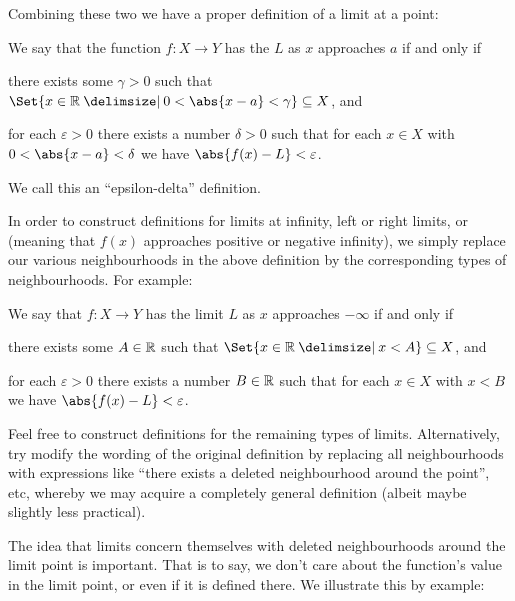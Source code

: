 Combining these two we have a proper definition of a limit at a point:

\begin{definition}
	We say that the function $f \colon X \to Y$ has the  $L$ as $x$ approaches $a$ if and only if
	\begin{romanlist}
		\item there exists some $\gamma > 0$ such that $\Set{x \in \R \given 0 < \abs{x - a} < \gamma} \subseteq X$, and
		\item for each $\varepsilon > 0$ there exists a number $\delta > 0$ such that for each $x \in X$ with $0 < \abs{x - a} < \delta$ we have $\abs{f(x) - L} < \varepsilon$.
	\end{romanlist}
\end{definition}

\noindent
We call this an ``epsilon-delta'' definition.

In order to construct definitions for limits at infinity, left or right limits, or  (meaning that $f(x)$ approaches positive or negative infinity), we simply replace our various neighbourhoods in the above definition by the corresponding types of neighbourhoods.
For example:

\begin{definition}
	We say that $f \colon X \to Y$ has the limit $L$ as $x$ approaches $-\infty$ if and only if
	\begin{romanlist}
		\item there exists some $A \in \mathbb{R}$ such that $\Set{x \in \R \given x < A} \subseteq X$, and
		\item for each $\varepsilon > 0$ there exists a number $B \in \mathbb{R}$ such that for each $x \in X$ with $x < B$ we have $\abs{f(x) - L} < \varepsilon$.
	\end{romanlist}
\end{definition}

\begin{exercise}
	Feel free to construct definitions for the remaining types of limits.
	Alternatively, try modify the wording of the original definition by replacing all neighbourhoods with expressions like ``there exists a deleted neighbourhood around the point'', etc, whereby we may acquire a completely general definition (albeit maybe slightly less practical).
\end{exercise}

\noindent
The idea that limits concern themselves with deleted neighbourhoods around the limit point is important.
That is to say, we don't care about the function's value in the limit point, or even if it is defined there.
We illustrate this by example:

